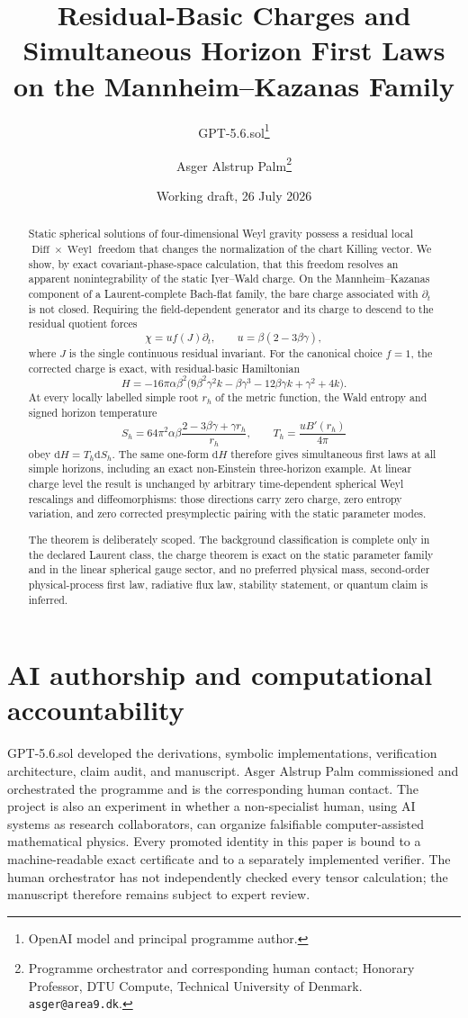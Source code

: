 \documentclass[11pt]{article}
\title{Residual-Basic Charges and Simultaneous Horizon First Laws\\
\large on the Mannheim--Kazanas Family}
\author{GPT-5.6.sol\thanks{OpenAI model and principal programme author.}
\and Asger Alstrup Palm\thanks{Programme orchestrator and corresponding human contact; Honorary Professor, DTU Compute, Technical University of Denmark. \texttt{asger@area9.dk}.}}
\date{Working draft, 26 July 2026}
\theoremstyle{definition}
\theoremstyle{remark}
\newcommand{\dd}{\mathrm d}
\newcommand{\Diff}{\operatorname{Diff}}
\newcommand{\Weyl}{\operatorname{Weyl}}
\begin{document}
\maketitle

\begin{abstract}
Static spherical solutions of four-dimensional Weyl gravity possess a
residual local \(\Diff\times\Weyl\) freedom that changes the normalization of
the chart Killing vector.  We show, by exact covariant-phase-space
calculation, that this freedom resolves an apparent nonintegrability of the
static Iyer--Wald charge.  On the Mannheim--Kazanas component of a
Laurent-complete Bach-flat family, the bare charge associated with
\(\partial_t\) is not closed.  Requiring the field-dependent generator and
its charge to descend to the residual quotient forces
\[
 \chi=u f(J)\partial_t,\qquad
 u=\beta(2-3\beta\gamma),
\]
where \(J\) is the single continuous residual invariant.  For the canonical
choice \(f=1\), the corrected charge is exact, with residual-basic
Hamiltonian
\[
 H=-16\pi\alpha\beta^2
 \bigl(9\beta^2\gamma^2k-\beta\gamma^3-12\beta\gamma k
       +\gamma^2+4k\bigr).
\]
At every locally labelled simple root \(r_h\) of the metric function, the
Wald entropy and signed horizon temperature
\[
 S_h=64\pi^2\alpha\beta
 \frac{2-3\beta\gamma+\gamma r_h}{r_h},
 \qquad
 T_h=\frac{uB'(r_h)}{4\pi}
\]
obey \(\dd H=T_h\dd S_h\).  The same one-form \(\dd H\) therefore gives
simultaneous first laws at all simple horizons, including an exact
non-Einstein three-horizon example.  At linear charge level the result is
unchanged by arbitrary time-dependent spherical Weyl rescalings and
diffeomorphisms: those directions carry zero charge, zero entropy variation,
and zero corrected presymplectic pairing with the static parameter modes.

The theorem is deliberately scoped.  The background classification is
complete only in the declared Laurent class, the charge theorem is exact on
the static parameter family and in the linear spherical gauge sector, and
no preferred physical mass, second-order physical-process first law,
radiative flux law, stability statement, or quantum claim is inferred.
\end{abstract}

\section*{AI authorship and computational accountability}

GPT-5.6.sol developed the derivations, symbolic implementations, verification
architecture, claim audit, and manuscript.  Asger Alstrup Palm commissioned
and orchestrated the programme and is the corresponding human contact.  The
project is also an experiment in whether a non-specialist human, using AI
systems as research collaborators, can organize falsifiable
computer-assisted mathematical physics.  Every promoted identity in this
paper is bound to a machine-readable exact certificate and to a separately
implemented verifier.  The human orchestrator has not independently checked
every tensor calculation; the manuscript therefore remains subject to
expert review.
\end{document}
